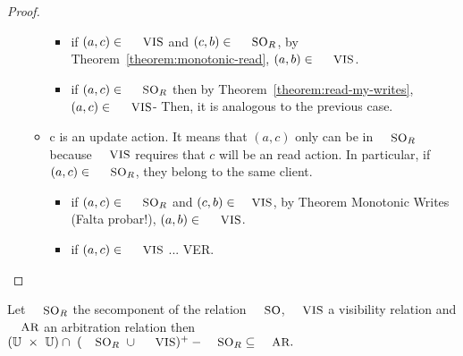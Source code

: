 \documentclass[envcountsect,runningheads,orivec]{llncs}
\begin{document}
\begin{proof}
\begin{itemize}
\begin{itemize}
	\begin{itemize}
		\item if $(a,c) \in\ \textsc{\small{VIS}}$ and $(c,b) \in\ \textsc{\small{SO}}_R$, by Theorem~\ref{theorem:monotonic-read}, $(a,b) \in\ \textsc{\small{VIS}}$.
		
		\item if $(a,c) \in\ \textsc{\small{SO}}_R$ then by Theorem~\ref{theorem:read-my-writes}, $(a,c) \in\ \textsc{\small{VIS}}$- Then, it is analogous to the previous case.
		
	\end{itemize}
	\item c is an update action. It means that $(a, c)$ only can be in $\textsc{\small{SO}}_R$ because $\textsc{\small{VIS}}$ requires that $c$ will be an read action. In particular, if  $(a,c) \in\ \textsc{\small{SO}}_R$, they belong to the same client.
	
	\begin{itemize}
		\item if $(a,c) \in\ \textsc{\small{SO}}_R$ and $(c,b) \in \textsc{\small{VIS}}$, by Theorem Monotonic Writes (Falta probar!), $(a,b) \in\ \textsc{\small{VIS}}$.
		\item if $(a,c) \in\ \textsc{\small{VIS}}$ ... VER.
	\end{itemize}
\end{itemize}


	
	
\end{itemize}
\end{proof}


\begin{theorem}

Let $\textsc{\small{SO}}_R$ the se\cond component of the relation $\textsc{\small{SO}}$, $\textsc{\small{VIS}}$ a visibility relation and $\textsc{\small{AR}}$ an arbitration relation then $(\mathbb{U}\ \times \ \mathbb{U}) \cap \ (\textsc{\small{SO}}_R \ \cup \ \textsc{\small{VIS}} ) ^{+} - \textsc{\small{SO}}_R \subseteq \textsc{\small{AR}}.$ 

\end{theorem}
 
\end{document}
